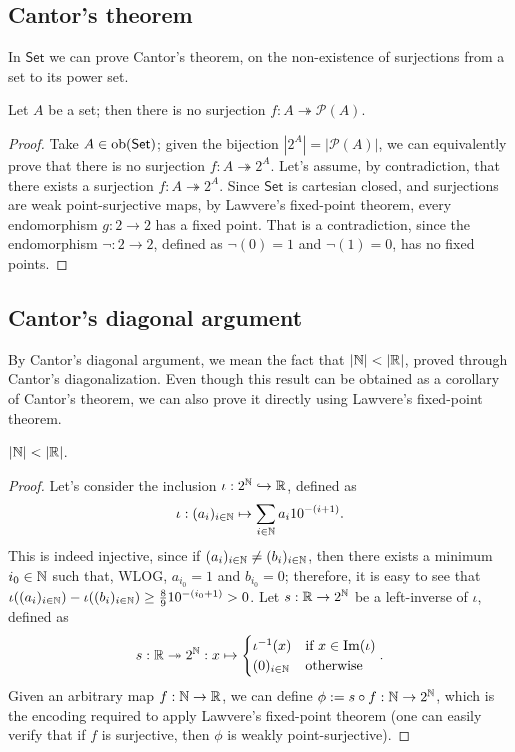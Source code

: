 \subsection*{Cantor's theorem}
In $\mathsf{Set}$ we can prove Cantor's theorem, on the non-existence of surjections from a set to its power set.

\begin{theorem}
    Let $A$ be a set; then there is no surjection $f: A \twoheadrightarrow \mathcal P(A)$.
\end{theorem}

\begin{proof}
    Take $A \in \operatorname{ob}(\mathsf{Set})$; given the bijection $|2^A| = |\mathcal P(A)|$, we can equivalently prove that there is no surjection $f: A \twoheadrightarrow 2^A$.
    Let's assume, by contradiction, that there exists a surjection $f: A \twoheadrightarrow 2^A$. Since $\mathsf{Set}$ is cartesian closed,
    and surjections are weak point-surjective maps, by Lawvere's fixed-point theorem, every endomorphism $g : 2 \to 2$ has a fixed point.
    That is a contradiction, since the endomorphism $\neg : 2 \to 2$, defined as $\neg(0) = 1$ and $\neg(1) = 0$, has no fixed points.
\end{proof}

\subsection*{Cantor's diagonal argument}
By Cantor's diagonal argument, we mean the fact that $|\mathbb{N}| < |\mathbb{R}|$, proved through Cantor's diagonalization.
Even though this result can be obtained as a corollary of Cantor's theorem, we can also prove it directly using Lawvere's fixed-point theorem.

\begin{theorem}
    $|\mathbb{N}| < |\mathbb{R}|$.
\end{theorem}

\begin{proof}
    Let's consider the inclusion $\iota : 2^{\mathbb{N}} \hookrightarrow \mathbb{R}$, defined as
    \[ \iota : (a_i)_{i \in \mathbb{N}} \mapsto \sum_{i \in \mathbb{N}} a_i 10^{-(i+1)}. \]
    This is indeed injective, since if $(a_i)_{i \in \mathbb{N}} \ne (b_i)_{i \in \mathbb{N}}$, then there exists a minimum $i_0 \in \mathbb{N}$ such that, WLOG, $a_{i_0} = 1$ and $b_{i_0} = 0$; therefore,
    it is easy to see that $\iota((a_i)_{i \in \mathbb{N}}) - \iota((b_i)_{i \in \mathbb{N}}) \geq \frac 89 10^{-(i_0+1)} > 0$.\newline
    Let $s : \mathbb{R} \to 2^{\mathbb{N}}$ be a left-inverse of $\iota$, defined as
    \[ s : \mathbb{R} \twoheadrightarrow 2^{\mathbb{N}} : x \mapsto \begin{cases}
        \iota^{-1}(x) & \text{if $x \in \operatorname{Im}(\iota)$} \\
        (0)_{i \in \mathbb{N}} & \text{otherwise}
    \end{cases}. \]
    Given an arbitrary map $f : \mathbb{N} \to \mathbb{R}$, we can define $\phi:=s \circ f : \mathbb{N} \to 2^{\mathbb{N}}$, which is the encoding required to apply Lawvere's fixed-point theorem (one can easily verify that if $f$ is surjective, then $\phi$ is weakly point-surjective).
\end{proof}

